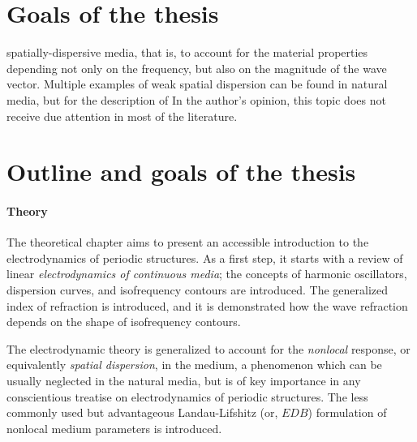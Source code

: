 \section{Goals of the thesis}
spatially-dispersive media, that is, to account for the material properties depending not only on the frequency, but also on the magnitude of the wave vector.
Multiple examples of weak spatial dispersion can be found in natural media, but for the description of  
In the author's opinion, this topic does not receive due attention in most of the literature.


\section{Outline and goals of the thesis}
\paragraph{Theory} %
The theoretical chapter aims to present an accessible introduction to the electrodynamics of periodic structures. As a first step, it starts with a review of linear \textit{electrodynamics of continuous media}; the concepts of harmonic oscillators, dispersion curves, and isofrequency contours are introduced. The generalized index of refraction is introduced, and it is demonstrated how the wave refraction depends on the shape of isofrequency contours.

The electrodynamic theory is generalized to account for the \textit{nonlocal} response, or equivalently \textit{spatial dispersion}, in the medium, a phenomenon which can be usually neglected in the natural media, but is of key importance in any conscientious treatise on electrodynamics of periodic structures.
The less commonly used but advantageous Landau-Lifshitz (or, $EDB$) formulation of nonlocal medium parameters is introduced. 

